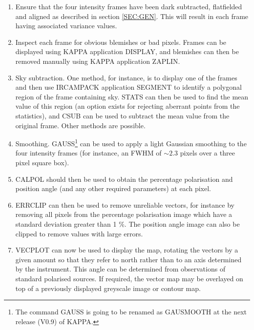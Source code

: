 \begin{enumerate}

\item Ensure that the four intensity frames have been dark subtracted,
flatfielded and aligned as described in section \ref{SEC:GEN}. This
will result in each frame having associated variance values.

\item Inspect each frame for obvious blemishes or bad pixels. Frames
can be displayed using {\small KAPPA} application {\small DISPLAY}, and
blemishes can then be removed manually using {\small KAPPA} application
{\small ZAPLIN}.

\item Sky subtraction. One method, for instance, is to display one of
the frames and then use {\small IRCAMPACK} application {\small SEGMENT}
to identify a polygonal region of the frame containing sky. {\small
STATS} can then be used to find the mean value of this region (an
option exists for rejecting aberrant points from the statistics), and
{\small CSUB} can be used to subtract the mean value from the original
frame. Other methods are possible.

\item Smoothing. {\small GAUSS}\footnote{The command GAUSS is going to
be renamed as GAUSMOOTH at the next release (V0.9) of KAPPA.} can be
used to apply a light Gaussian smoothing to the four intensity frames
(for instance, an {\small FWHM} of $\sim2.3$ pixels over a three pixel
square box).

\item {\small CALPOL} should then be used to obtain the percentage
polarisation and position angle (and any other required parameters) at
each pixel.

\item {\small ERRCLIP} can then be used to remove unreliable vectors,
for instance by removing all pixels from the percentage polarisation
image which have a standard deviation greater than 1 \%. The position
angle image can also be clipped to remove values with large errors.

\item {\small VECPLOT} can now be used to display the map, rotating the
vectors by a given amount so that they refer to north rather than to an
axis determined by the instrument. This angle can be determined from
observations of standard polarised sources. If required, the vector map
may be overlayed on top of a previously displayed greyscale image or
contour map.

\end{enumerate}

